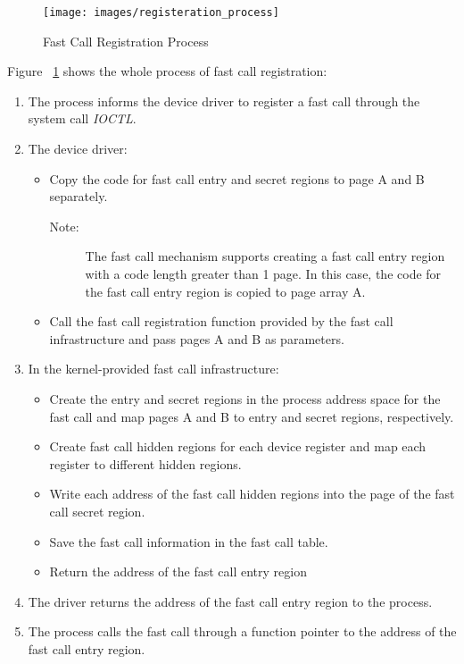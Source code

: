 \begin{figure}[tbp]
  \centering
  \texttt{[image: images/registeration\_process]}
  \caption[Fast Call Registration Process]{Fast Call Registration Process}
  \label{fig:registeration_process}
\end{figure}

Figure ~\ref{fig:registeration_process} shows the whole process of fast call registration:
\begin{enumerate}
  \item The process informs the device driver to register a fast call through the system call \emph{IOCTL}.
  \item The device driver:
    \begin{itemize}
      \item Copy the code for fast call entry and secret regions to page A and B separately.
        \begin{description}
          \item[Note:] The fast call mechanism supports creating a fast call entry region with a code length greater than 1 page. In this case, the code for the fast call entry region is copied to page array A.
        \end{description}
      \item Call the fast call registration function provided by the fast call infrastructure and pass pages A and B as parameters.
    \end{itemize}
  \item In the kernel-provided fast call infrastructure:
    \begin{itemize}
      \item Create the entry and secret regions in the process address space for the fast call and map pages A and B to entry and secret regions, respectively.
      \item Create fast call hidden regions for each device register and map each register to different hidden regions.
      \item Write each address of the fast call hidden regions into the page of the fast call secret region.
      \item Save the fast call information in the fast call table.
      \item Return the address of the fast call entry region
    \end{itemize}
  \item The driver returns the address of the fast call entry region to the process.
  \item The process calls the fast call through a function pointer to the address of the fast call entry region.
\end{enumerate}


